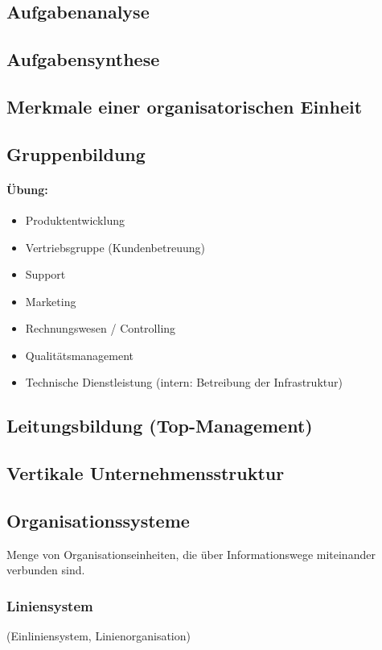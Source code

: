 \subsection{Aufgabenanalyse}
\subsection{Aufgabensynthese}
\subsection{Merkmale einer organisatorischen Einheit}
\subsection{Gruppenbildung}
\paragraph{Übung:}
\begin{itemize}
\item Produktentwicklung
\item Vertriebsgruppe (Kundenbetreuung)
\item Support
\item Marketing
\item Rechnungswesen / Controlling
\item Qualitätsmanagement
\item Technische Dienstleistung (intern: Betreibung der Infrastruktur)
\end{itemize}
\subsection{Leitungsbildung (Top-Management)}
\subsection{Vertikale Unternehmensstruktur}
\subsection{Organisationssysteme}
Menge von Organisationseinheiten, die über Informationswege miteinander verbunden sind.
\subsubsection{Liniensystem}
(Einliniensystem, Linienorganisation)
